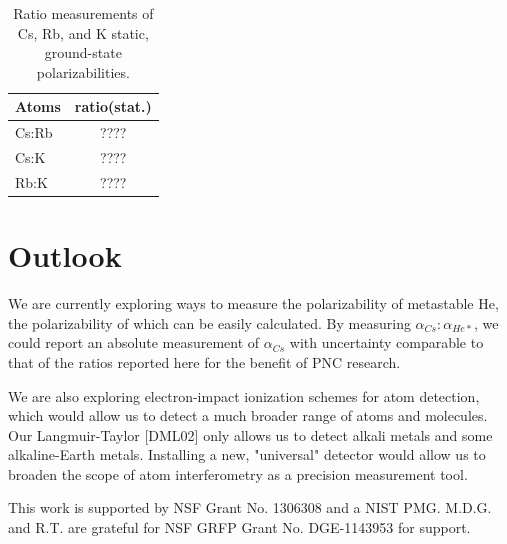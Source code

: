 \documentclass[twocolumn, prl,showpacs,superscriptaddress]{revtex4-1}   %
\begin{document}
\begingroup
\begin{table}
\caption{\label{tableRatio}Ratio measurements of Cs, Rb, and K static, ground-state polarizabilities.}
\begin{center}
\begin{tabular}{l c}
\hline\hline
Atoms & ratio(stat.) \\
\hline
Cs:Rb & ???? \\
Cs:K  & ???? \\
Rb:K  & ???? \\
\hline\hline
\end{tabular}
\end{center}
\end{table}
\endgroup


\section{Outlook}

We are currently exploring ways to measure the polarizability of metastable He, the polarizability of which can be easily calculated. By measuring $\alpha_{Cs}:\alpha_{He*}$, we could report an absolute measurement of $\alpha_{Cs}$ with uncertainty comparable to that of the ratios reported here for the benefit of PNC research.

We are also exploring electron-impact ionization schemes for atom detection, which would allow us to detect a much broader range of atoms and molecules. Our Langmuir-Taylor [DML02] only allows us to detect alkali metals and some alkaline-Earth metals. Installing a new, "universal" detector would allow us to broaden the scope of atom interferometry as a precision measurement tool. 

This work is supported by NSF Grant No. 1306308 and a NIST PMG. M.D.G. and R.T. are grateful for NSF GRFP Grant No. DGE-1143953 for support. 



\end{document}
